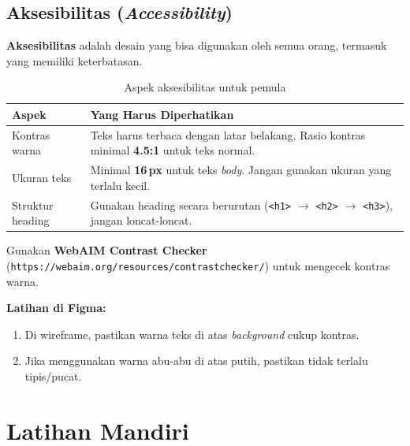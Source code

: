 \subsection{Aksesibilitas (\emph{Accessibility})}

\textbf{Aksesibilitas} adalah desain yang bisa digunakan oleh semua orang, termasuk yang memiliki keterbatasan.

\begin{table}[ht]
\centering
\caption{Aspek aksesibilitas untuk pemula}
\label{tab:m02-akses}
\begin{tabular}{lp{8cm}}
\toprule
\textbf{Aspek} & \textbf{Yang Harus Diperhatikan} \\
\midrule
Kontras warna & Teks harus terbaca dengan latar belakang. Rasio kontras minimal \textbf{4.5:1} untuk teks normal. \\
Ukuran teks & Minimal \textbf{16\,px} untuk teks \emph{body}. Jangan gunakan ukuran yang terlalu kecil. \\
Struktur heading & Gunakan heading secara berurutan (\texttt{<h1>} $\rightarrow$ \texttt{<h2>} $\rightarrow$ \texttt{<h3>}), jangan loncat-loncat. \\
\bottomrule
\end{tabular}
\end{table}

\begin{tip}
Gunakan \textbf{WebAIM Contrast Checker} (\texttt{https://webaim.org/resources/contrastchecker/}) untuk mengecek kontras warna.
\end{tip}

\textbf{Latihan di Figma:}
\begin{enumerate}
  \item Di wireframe, pastikan warna teks di atas \emph{background} cukup kontras.
  \item Jika menggunakan warna abu-abu di atas putih, pastikan tidak terlalu tipis/pucat.
\end{enumerate}

\section{Latihan Mandiri}
\label{sec:m02-latihan}

